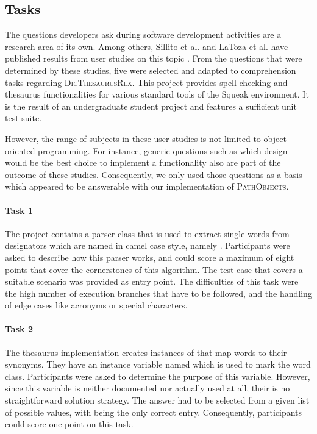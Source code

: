 \subsection{Tasks}
The questions developers ask during software development activities are a research area of its own.
Among others, Sillito et al. and LaToza et al. have published results from user studies on this topic \cite{sillito_asking_2008, latoza_hard--answer_2010}.
From the questions that were determined by these studies, five were selected and adapted to comprehension tasks regarding \textsc{DicThesaurusRex}.
This project provides spell checking and thesaurus functionalities for various standard tools of the Squeak environment.
It is the result of an undergraduate student project and features a sufficient unit test suite.

However, the range of subjects in these user studies is not limited to object-oriented programming.
For instance, generic questions such as which design would be the best choice to implement a functionality also are part of the outcome of these studies.
Consequently, we only used those questions as a basis which appeared to be answerable with our implementation of \textsc{PathObjects}.

\paragraph{Task 1} The project contains a parser class that is used to extract single words from designators which are named in camel case style, namely .
Participants were asked to describe how this parser works, and could score a maximum of eight points that cover the cornerstones of this algorithm.
The test case  that covers a suitable scenario was provided as entry point.
The difficulties of this task were the high number of execution branches that have to be followed, and the handling of edge cases like acronyms or special characters.

\paragraph{Task 2} The thesaurus implementation creates instances of  that map words to their synonyms.
They have an instance variable named  which is used to mark the word class.
Participants were asked to determine the purpose of this variable.
However, since this variable is neither documented nor actually used at all, their is no straightforward solution strategy.
The answer had to be selected from a given list of possible values, with  being the only correct entry.
Consequently, participants could score one point on this task.

